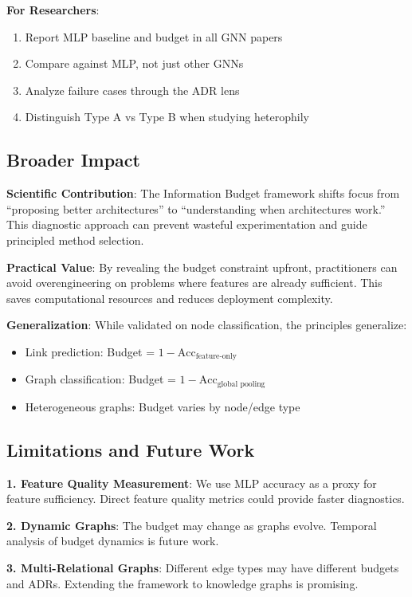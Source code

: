 \textbf{For Researchers}:
\begin{enumerate}
    \item Report MLP baseline and budget in all GNN papers
    \item Compare against MLP, not just other GNNs
    \item Analyze failure cases through the ADR lens
    \item Distinguish Type A vs Type B when studying heterophily
\end{enumerate}

\subsection{Broader Impact}

\textbf{Scientific Contribution}: The Information Budget framework shifts focus from ``proposing better architectures'' to ``understanding when architectures work.'' This diagnostic approach can prevent wasteful experimentation and guide principled method selection.

\textbf{Practical Value}: By revealing the budget constraint upfront, practitioners can avoid overengineering on problems where features are already sufficient. This saves computational resources and reduces deployment complexity.

\textbf{Generalization}: While validated on node classification, the principles generalize:
\begin{itemize}
    \item Link prediction: Budget = $1 - \text{Acc}_{\text{feature-only}}$
    \item Graph classification: Budget = $1 - \text{Acc}_{\text{global pooling}}$
    \item Heterogeneous graphs: Budget varies by node/edge type
\end{itemize}

\subsection{Limitations and Future Work}

\textbf{1. Feature Quality Measurement}: We use MLP accuracy as a proxy for feature sufficiency. Direct feature quality metrics could provide faster diagnostics.

\textbf{2. Dynamic Graphs}: The budget may change as graphs evolve. Temporal analysis of budget dynamics is future work.

\textbf{3. Multi-Relational Graphs}: Different edge types may have different budgets and ADRs. Extending the framework to knowledge graphs is promising.

